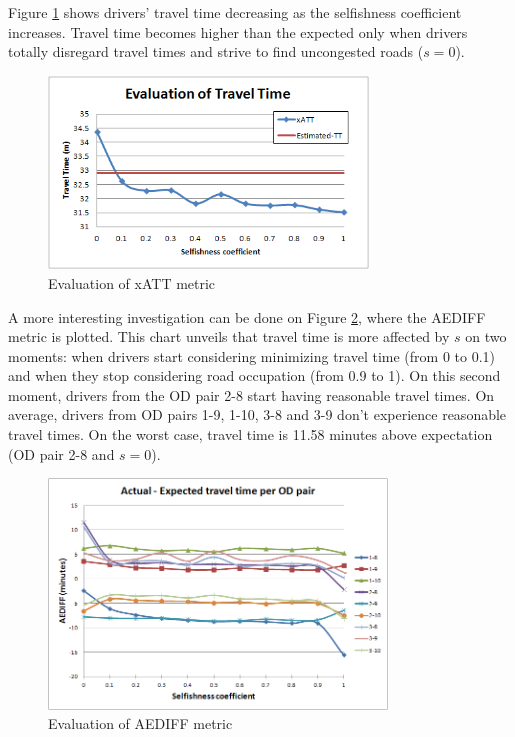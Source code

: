\documentclass[12pt]{article}
\begin{document}
Figure \ref{fig:globalTravelTime} shows drivers' travel time decreasing as the selfishness coefficient increases. Travel time becomes higher than the expected only when drivers totally  disregard travel times and strive to find uncongested roads ($s=0$).

\begin{figure}[ht]
    \centerline{\includegraphics[width=8.5cm]{img/globalTravelTime.png}}
    \caption{Evaluation of xATT metric}
    \label{fig:globalTravelTime}
\end{figure}

A more interesting investigation can be done on Figure \ref{fig:travelTimePerOD}, where the AEDIFF metric is plotted. This chart unveils that travel time is more affected by $s$ on two moments: when drivers start considering minimizing travel time (from 0 to 0.1) and when they stop considering road occupation (from 0.9 to 1). On this second moment, drivers from the OD pair 2-8 start having reasonable travel times. On average, drivers from OD pairs 1-9, 1-10, 3-8 and 3-9 don't experience reasonable travel times. On the worst case, travel time is 11.58 minutes above expectation (OD pair 2-8 and $s=0$).

\begin{figure}[ht]
    \centerline{\includegraphics[width=9cm]{img/travelTimePerOD.png}}
    \caption{Evaluation of AEDIFF metric}
    \label{fig:travelTimePerOD}
\end{figure}
\end{document}

